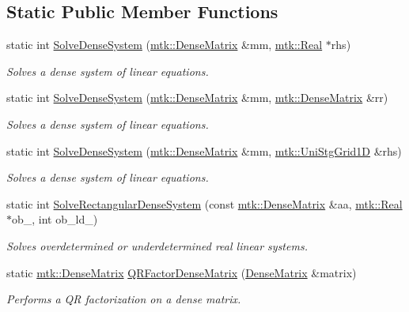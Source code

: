 \subsection*{Static Public Member Functions}
\begin{DoxyCompactItemize}
\item 
static int \hyperlink{classmtk_1_1LAPACKAdapter_a7428bccf74fd4a4af68fb7233846da22}{Solve\+Dense\+System} (\hyperlink{classmtk_1_1DenseMatrix}{mtk\+::\+Dense\+Matrix} \&mm, \hyperlink{group__c01-roots_gac080bbbf5cbb5502c9f00405f894857d}{mtk\+::\+Real} $\ast$rhs)
\begin{DoxyCompactList}\small\item\em Solves a dense system of linear equations. \end{DoxyCompactList}\item 
static int \hyperlink{classmtk_1_1LAPACKAdapter_af0723bba1d73450119d093b9cf1ff6f0}{Solve\+Dense\+System} (\hyperlink{classmtk_1_1DenseMatrix}{mtk\+::\+Dense\+Matrix} \&mm, \hyperlink{classmtk_1_1DenseMatrix}{mtk\+::\+Dense\+Matrix} \&rr)
\begin{DoxyCompactList}\small\item\em Solves a dense system of linear equations. \end{DoxyCompactList}\item 
static int \hyperlink{classmtk_1_1LAPACKAdapter_ac38be1e30a2456b2a14c8a81f47c4ba1}{Solve\+Dense\+System} (\hyperlink{classmtk_1_1DenseMatrix}{mtk\+::\+Dense\+Matrix} \&mm, \hyperlink{classmtk_1_1UniStgGrid1D}{mtk\+::\+Uni\+Stg\+Grid1\+D} \&rhs)
\begin{DoxyCompactList}\small\item\em Solves a dense system of linear equations. \end{DoxyCompactList}\item 
static int \hyperlink{classmtk_1_1LAPACKAdapter_a380f148ffdf96bae2f79ae28f1a6560c}{Solve\+Rectangular\+Dense\+System} (const \hyperlink{classmtk_1_1DenseMatrix}{mtk\+::\+Dense\+Matrix} \&aa, \hyperlink{group__c01-roots_gac080bbbf5cbb5502c9f00405f894857d}{mtk\+::\+Real} $\ast$ob\+\_\+, int ob\+\_\+ld\+\_\+)
\begin{DoxyCompactList}\small\item\em Solves overdetermined or underdetermined real linear systems. \end{DoxyCompactList}\item 
static \hyperlink{classmtk_1_1DenseMatrix}{mtk\+::\+Dense\+Matrix} \hyperlink{classmtk_1_1LAPACKAdapter_ae5c6e78c9c819c9ac7a6f31bfd011d7a}{Q\+R\+Factor\+Dense\+Matrix} (\hyperlink{classmtk_1_1DenseMatrix}{Dense\+Matrix} \&matrix)
\begin{DoxyCompactList}\small\item\em Performs a Q\+R factorization on a dense matrix. \end{DoxyCompactList}\end{DoxyCompactItemize}



